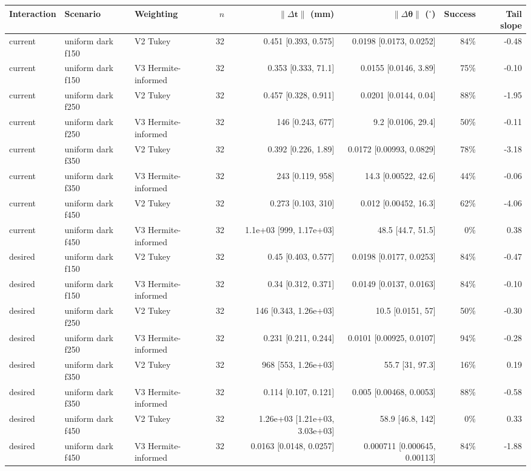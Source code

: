 \begin{tabular}{@{}lllrrrrr@{}}
\toprule
Interaction & Scenario & Weighting & $n$ & $\lVert\Delta\mathbf{t}\rVert$ (mm) & $\lVert\Delta\boldsymbol{\theta}\rVert$ ($^\circ$) & Success & Tail slope \\
\midrule
current & uniform dark f150 & V2 Tukey & 32 & 0.451 [0.393, 0.575] & 0.0198 [0.0173, 0.0252] & 84\% & -0.48 \\
current & uniform dark f150 & V3 Hermite-informed & 32 & 0.353 [0.333, 71.1] & 0.0155 [0.0146, 3.89] & 75\% & -0.10 \\
current & uniform dark f250 & V2 Tukey & 32 & 0.457 [0.328, 0.911] & 0.0201 [0.0144, 0.04] & 88\% & -1.95 \\
current & uniform dark f250 & V3 Hermite-informed & 32 & 146 [0.243, 677] & 9.2 [0.0106, 29.4] & 50\% & -0.11 \\
current & uniform dark f350 & V2 Tukey & 32 & 0.392 [0.226, 1.89] & 0.0172 [0.00993, 0.0829] & 78\% & -3.18 \\
current & uniform dark f350 & V3 Hermite-informed & 32 & 243 [0.119, 958] & 14.3 [0.00522, 42.6] & 44\% & -0.06 \\
current & uniform dark f450 & V2 Tukey & 32 & 0.273 [0.103, 310] & 0.012 [0.00452, 16.3] & 62\% & -4.06 \\
current & uniform dark f450 & V3 Hermite-informed & 32 & 1.1e+03 [999, 1.17e+03] & 48.5 [44.7, 51.5] & 0\% & 0.38 \\
desired & uniform dark f150 & V2 Tukey & 32 & 0.45 [0.403, 0.577] & 0.0198 [0.0177, 0.0253] & 84\% & -0.47 \\
desired & uniform dark f150 & V3 Hermite-informed & 32 & 0.34 [0.312, 0.371] & 0.0149 [0.0137, 0.0163] & 84\% & -0.10 \\
desired & uniform dark f250 & V2 Tukey & 32 & 146 [0.343, 1.26e+03] & 10.5 [0.0151, 57] & 50\% & -0.30 \\
desired & uniform dark f250 & V3 Hermite-informed & 32 & 0.231 [0.211, 0.244] & 0.0101 [0.00925, 0.0107] & 94\% & -0.28 \\
desired & uniform dark f350 & V2 Tukey & 32 & 968 [553, 1.26e+03] & 55.7 [31, 97.3] & 16\% & 0.19 \\
desired & uniform dark f350 & V3 Hermite-informed & 32 & 0.114 [0.107, 0.121] & 0.005 [0.00468, 0.0053] & 88\% & -0.58 \\
desired & uniform dark f450 & V2 Tukey & 32 & 1.26e+03 [1.21e+03, 3.03e+03] & 58.9 [46.8, 142] & 0\% & 0.33 \\
desired & uniform dark f450 & V3 Hermite-informed & 32 & 0.0163 [0.0148, 0.0257] & 0.000711 [0.000645, 0.00113] & 84\% & -1.88 \\
\bottomrule
\end{tabular}
